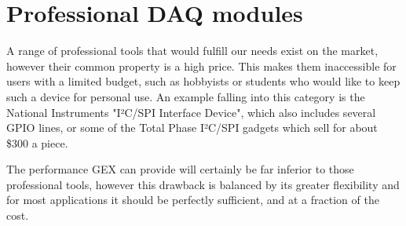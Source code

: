\section{Professional DAQ modules}

A range of professional tools that would fulfill our needs exist on the market,
however their common property is a high price. This makes them inaccessible for users with a limited budget, such as hobbyists or students who would like to keep such a device for personal use. An example falling into this category is the National Instruments "I²C/SPI Interface Device", which also includes several GPIO lines, or some of the Total Phase I²C/SPI gadgets which sell for about \$300 a piece. 

The performance GEX can provide will certainly be far inferior to those professional tools, however this drawback is balanced by its greater flexibility and for most applications it should be perfectly sufficient, and at a fraction of the cost.



